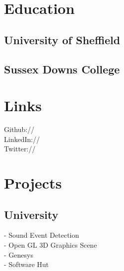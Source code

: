 \documentclass[]{deedy-resume-openfont}
\begin{document}
\begin{minipage}[t]{0.33\textwidth} 


\section{Education} 

\subsection{University of Sheffield}
\sectionsep

\subsection{Sussex Downs College}
\sectionsep


\section{Links} 
Github:// \href{https://github.com/jackdeadman}{} \\
LinkedIn://  \href{https://www.linkedin.com/in/jack-deadman-19101297}{} \\
Twitter://  \href{https://twitter.com/jackdeadman96}{} \\
\sectionsep


\section{Projects}
\subsection{University}
- Sound Event Detection\\
- Open GL 3D Graphics Scene\\
- Genesys\\
- Software Hut
\sectionsep

\end{minipage}
\end{document}
